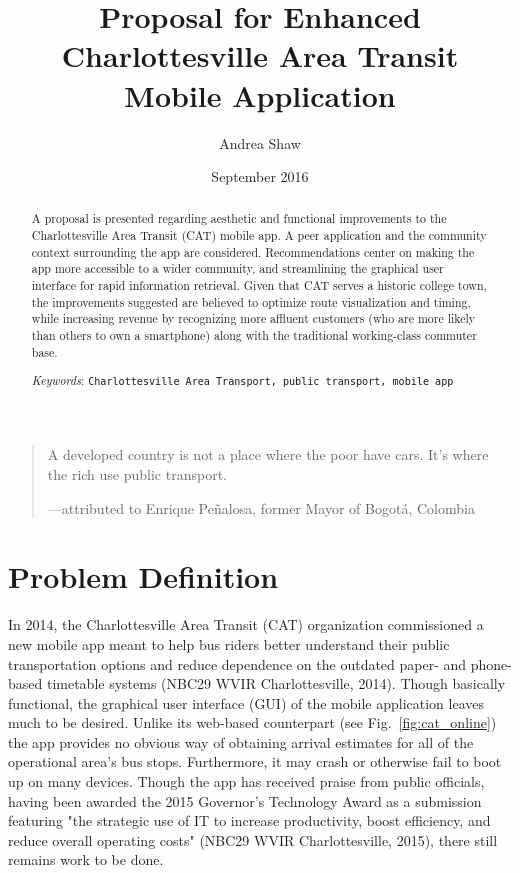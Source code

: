 \documentclass[12pt,letterpaper]{article}
\title{Proposal for Enhanced Charlottesville Area Transit Mobile Application}
\author{Andrea Shaw \\ \email{rcs8vq@virginia.edu}}%
\affil{Department of Computer Science \\ University of Virginia}
\date{September 2016}
\begin{document}
\maketitle

\begin{abstract}

    A proposal is presented regarding aesthetic and functional improvements to
    the Charlottesville Area Transit (CAT) mobile app. A peer application and the
    community context surrounding the app are considered. Recommendations
    center on making the app more accessible to a wider community, and
    streamlining the graphical user interface for rapid information retrieval.
    Given that CAT serves a historic college town, the improvements suggested
    are believed to optimize route visualization and timing, while increasing
    revenue by recognizing more affluent customers
    (who are more likely than others to own a smartphone) along
    with the traditional working-class commuter base.


    \bigskip
    \noindent \emph{Keywords}: {\tt Charlottesville Area Transport, public transport, mobile app}
\end{abstract}

\vspace{5mm}

\begin{quote}
A developed country is not a place where the poor have cars. It's where the rich use public transport.

\raggedleft ---attributed to Enrique Pe\~{n}alosa, former Mayor of Bogot\'{a}, Colombia
\end{quote}

\section{Problem Definition}
In 2014, the Charlottesville Area Transit (CAT) organization commissioned a new
mobile app meant to help bus riders better understand their public
transportation options and reduce dependence on the outdated paper- and phone-based
timetable systems (NBC29 WVIR Charlottesville, 2014). Though basically
functional, the graphical user interface (GUI) of the mobile application leaves
much to be desired. Unlike its web-based counterpart (see Fig.~\ref{fig:cat_online})
the app provides no obvious way of obtaining arrival estimates for all of the
operational area's bus stops. Furthermore, it may crash or otherwise fail to
boot up on many devices. Though the app has received praise from public officials,
having been awarded the 2015 Governor's Technology Award
as a submission featuring "the strategic use of IT to
increase productivity, boost efficiency, and reduce overall operating costs"
(NBC29 WVIR Charlottesville, 2015),
there still remains work to be done.
\end{document}
